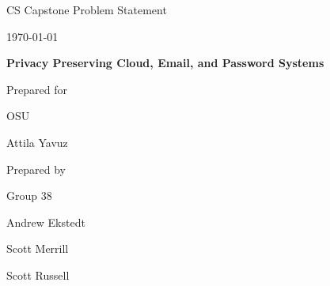 \documentclass[onecolumn, draftclsnofoot,10pt, compsoc]{IEEEtran}
\def \CapstoneTeamName{		The Cleverly Named Team}
\def \CapstoneTeamNumber{		38}
\def \GroupMemberOne{			Andrew Ekstedt}
\def \GroupMemberTwo{			Scott Merrill}
\def \GroupMemberThree{			Scott Russell}
\def \CapstoneProjectName{		Privacy Preserving Cloud, Email, and Password Systems}
\def \CapstoneSponsorCompany{	OSU}
\def \CapstoneSponsorPerson{		Attila Yavuz}
\def \DocType{		Problem Statement }
\newcommand{\NameSigPair}[1]{\par
\makebox[2.75in][r]{#1} \hfil 	\makebox[3.25in]{\makebox[2.25in]{\hrulefill} \hfill		\makebox[.75in]{\hrulefill}}
\par\vspace{-12pt} \textit{\tiny\noindent
\makebox[2.75in]{} \hfil		\makebox[3.25in]{\makebox[2.25in][r]{Signature} \hfill	\makebox[.75in][r]{Date}}}}
\renewcommand{\NameSigPair}[1]{#1}
\begin{document}
\begin{titlepage}
    \begin{singlespace}
        \hfill
        \par\vspace{.2in}
        \centering
        \scshape{
            \huge CS Capstone \DocType \par
            {\large\today}\par
            \vspace{.5in}
            \textbf{\Huge\CapstoneProjectName}\par
            \vfill
            {\large Prepared for}\par
            \Huge \CapstoneSponsorCompany\par
            \vspace{5pt}
            {\Large\NameSigPair{\CapstoneSponsorPerson}\par}
            {\large Prepared by }\par
            Group\CapstoneTeamNumber\par
            \vspace{5pt}
            {\Large
                \NameSigPair{\GroupMemberOne}\par
                \NameSigPair{\GroupMemberTwo}\par
                \NameSigPair{\GroupMemberThree}\par
            }
            \vspace{20pt}
        }
        \begin{abstract}
        	This document is written using one sentence per line.
        	This allows you to have sensible diffs when you use \LaTeX with version control, as well as giving a quick visual test to see if sentences are too short/long.
        	If you have questions, ``The Not So Short Guide to LaTeX'' is a great resource (\url{https://tobi.oetiker.ch/lshort/lshort.pdf})
        \end{abstract}
    \end{singlespace}
\end{titlepage}
\newpage
{}
\tableofcontents
\clearpage
\end{document}
